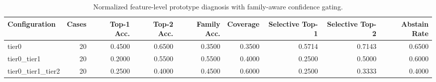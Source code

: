 \begin{table}[t]
\centering
\caption{Normalized feature-level prototype diagnosis with family-aware confidence gating.}
\label{tab:dice_stressor_hierarchical_diagnosis}
\footnotesize
\begin{tabular}{lrrrrrrrr}
\toprule
Configuration & Cases & Top-1 Acc. & Top-2 Acc. & Family Acc. & Coverage & Selective Top-1 & Selective Top-2 & Abstain Rate \\
\midrule
tier0 & 20 & 0.4500 & 0.6500 & 0.3500 & 0.3500 & 0.5714 & 0.7143 & 0.6500 \\
tier0_tier1 & 20 & 0.2000 & 0.5500 & 0.5500 & 0.4000 & 0.2500 & 0.5000 & 0.6000 \\
tier0_tier1_tier2 & 20 & 0.2500 & 0.4000 & 0.4500 & 0.6000 & 0.2500 & 0.3333 & 0.4000 \\
\bottomrule
\end{tabular}

\end{table}
